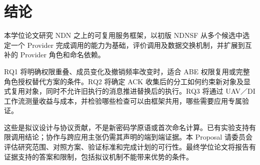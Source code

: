 \chapter{结论}
本学位论文研究 NDN 之上的可复用服务框架，以初版 NDNSF 从多个候选中选定一个 Provider 完成调用的能力为基础，评价调用及数据交换机制，并扩展到互补的 Provider 角色和命名依赖。

RQ1 将明确权限重叠、成员变化及撤销频率改变时，适合 ABE 权限复用或完整角色授权替代方案的条件。RQ2 将确定 ACK 收集后的分工如何约束新对象及显式复用对象，同时不允许旧执行的消息推进替换后的执行。RQ3 将通过 UAV／DI 工作流测量收益与成本，并检验哪些检查可以由框架共用，哪些需要应用专属验证。

这些是拟议设计与协议贡献，不是新密码学原语或首次命名计算。已有实验支持有限调用结论；协作与跨应用主张仍需其声明的端到端证据。本 Proposal 请委员会评估研究范围、对照方案、验证标准和完成计划的可行性。最终学位论文将报告有证据支持的答案和限制，包括拟议机制不能带来优势的条件。
